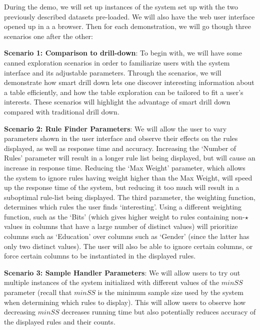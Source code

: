  During the demo, we will set up instances of the system set up with the two previously described datasets pre-loaded. We will also have the web user interface opened up in a a browser. Then for each demonstration, we will go though three scenarios one after the other:
\squishlist
\item {\bf Scenario 1: Comparison to drill-down}: To begin with, we will have some canned exploration scenarios in order to familiarize users with the system interface and its adjustable parameters. Through the scenarios, we will demonstrate how smart drill down lets one discover interesting information about a table efficiently, and how the table exploration can be tailored to fit a user's interests. These scenarios will highlight the advantage of smart drill down compared with traditional drill down. 
\item {\bf Scenario 2: Rule Finder Parameters}: We will allow the user to vary parameters shown in the user interface and observe their effects on the rules displayed, as well as response time and accuracy. Increasing the `Number of Rules' parameter will result in a longer rule list being displayed, but will cause an increase in response time. Reducing the `Max Weight' parameter, which allows the system to ignore rules having weight higher than the Max Weight, will speed up the response time of the system, but reducing it too much will result in a suboptimal rule-list being displayed. The third parameter, the weighting function, determines which rules the user finds `interesting'. Using a different weighting function, such as the `Bits' (which gives higher weight to rules containing non-$\star$ values in columns that have a large number of distinct values) will prioritize columns such as `Education' over columns such as `Gender' (since the latter has only two distinct values). The user will also be able to ignore certain columns, or force certain columns to be instantiated in the displayed rules. 
\item {\bf Scenario 3: Sample Handler Parameters}: We will allow users to try out multiple instances of the system initialized with different values of the $minSS$  parameter (recall that $minSS$ is the minimum sample size used by the system when determining which rules to display). This will allow users to observe how decreasing $minSS$ decreases running time but also potentially reduces accuracy of the displayed rules and their counts.
\squishend